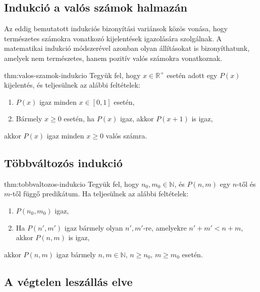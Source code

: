 \subsection*{Indukció a valós számok halmazán}

Az eddig bemutatott indukciós bizonyítási variánsok közös vonása,
hogy természetes számokra vonatkozó kijelentések igazolására szolgálnak.
A matematikai indukció módszerével azonban olyan állításokat is bizonyíthatunk,
amelyek nem természetes, hanem pozitív valós számokra vonatkoznak.
\begin{theorem}{thm:valos-szamok-indukcio} Tegyük fel, hogy
$x\in\mathbb{R}^{+}$ esetén adott egy $P(x)$ kijelentés, és teljesülnek
az alábbi feltételek: 
\begin{enumerate}
\item $P(x)$ igaz minden $x\in[0,1]$ esetén, 
\item Bármely $x\ge0$ esetén, ha $P(x)$ igaz, akkor $P(x+1)$ is igaz, 
\end{enumerate}
akkor $P(x)$ igaz minden $x\ge0$ valós számra. 
\end{theorem}


\subsection*{Többváltozós indukció}
\begin{theorem}{thm:tobbvaltozos-indukcio} Tegyük fel, hogy
$n_{0},m_{0}\in\mathbb{N}$, és $P(n,m)$ egy $n$-től és $m$-től
függő predikátum. Ha teljesülnek az alábbi feltételek: 
\begin{enumerate}
\item $P(n_{0},m_{0})$ igaz, 
\item Ha $P(n',m')$ igaz bármely olyan $n',m'$-re, amelyekre $n'+m'<n+m$,
akkor $P(n,m)$ is igaz, 
\end{enumerate}
akkor $P(n,m)$ igaz bármely $n,m\in\mathbb{N},\,n\ge n_{0},\,m\ge m_{0}$
esetén. 
\end{theorem}


\subsection*{A végtelen leszállás elve}

